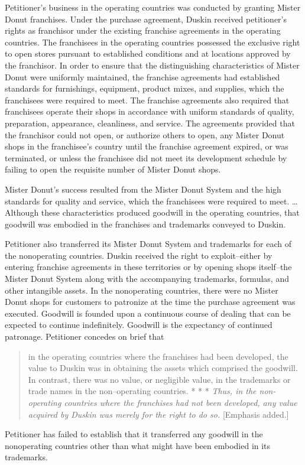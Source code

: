 \begin{select}
Petitioner's business in the operating countries was conducted by granting Mister Donut franchises. Under the purchase
agreement, Duskin received petitioner's rights as franchisor under the existing franchise agreements in the operating
countries. The franchisees in the operating countries possessed the exclusive right to open stores pursuant to established
conditions and at locations approved by the franchisor. In order to ensure that the distinguishing characteristics of
Mister Donut were uniformly maintained, the franchise agreements had established standards for furnishings, equipment,
product mixes, and supplies, which the franchisees were required to meet. The franchise agreements also required that
franchisees operate their shops in accordance with uniform standards of quality, preparation, appearance, cleanliness, and
service. The agreements provided that the franchisor could not open, or authorize others to open, any Mister Donut shops
in the franchisee's country until the franchise agreement expired, or was terminated, or unless the franchisee did not meet
its development schedule by failing to open the requisite number of Mister Donut shops.

Mister Donut's success resulted from the Mister Donut System and the high standards for quality and service, which
the franchisees were required to meet. \ldots Although these characteristics produced goodwill in the operating
countries, that goodwill was embodied in the franchises and trademarks conveyed to Duskin.

Petitioner also transferred its Mister Donut System and trademarks for each of the nonoperating countries.
Duskin received the right to exploit--either by entering franchise agreements in these territories or by opening shops
itself--the Mister Donut System along with the accompanying trademarks, formulas, and other intangible assets. In the
nonoperating countries, there were no Mister Donut shops for customers to patronize at the time the purchase agreement
was executed. Goodwill is founded upon a continuous course of dealing that can be expected to continue
indefinitely. Goodwill is the expectancy of continued patronage. Petitioner concedes on brief that
\begin{quote}
in the operating countries where the franchises had been developed, the value to Duskin was in obtaining the
assets which comprised the goodwill. In contrast, there was no value, or negligible value, in the trademarks or trade names in the non--operating countries. * * * \textit{Thus, in the non-operating countries where the franchises
had not been developed, any value acquired by Duskin was merely for the right to do so.} [Emphasis
added.]
\end{quote}
Petitioner has failed to establish that it transferred any goodwill in the nonoperating countries other than what might have
been embodied in its trademarks.


\end{select}
